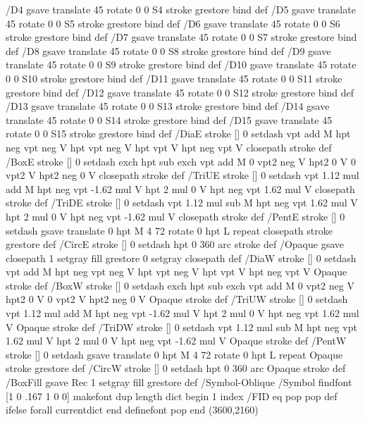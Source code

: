 {{/D4 { gsave translate 45 rotate 0 0 S4 stroke grestore } bind def
/D5 { gsave translate 45 rotate 0 0 S5 stroke grestore } bind def
/D6 { gsave translate 45 rotate 0 0 S6 stroke grestore } bind def
/D7 { gsave translate 45 rotate 0 0 S7 stroke grestore } bind def
/D8 { gsave translate 45 rotate 0 0 S8 stroke grestore } bind def
/D9 { gsave translate 45 rotate 0 0 S9 stroke grestore } bind def
/D10 { gsave translate 45 rotate 0 0 S10 stroke grestore } bind def
/D11 { gsave translate 45 rotate 0 0 S11 stroke grestore } bind def
/D12 { gsave translate 45 rotate 0 0 S12 stroke grestore } bind def
/D13 { gsave translate 45 rotate 0 0 S13 stroke grestore } bind def
/D14 { gsave translate 45 rotate 0 0 S14 stroke grestore } bind def
/D15 { gsave translate 45 rotate 0 0 S15 stroke grestore } bind def
/DiaE { stroke [] 0 setdash vpt add M
  hpt neg vpt neg V hpt vpt neg V
  hpt vpt V hpt neg vpt V closepath stroke } def
/BoxE { stroke [] 0 setdash exch hpt sub exch vpt add M
  0 vpt2 neg V hpt2 0 V 0 vpt2 V
  hpt2 neg 0 V closepath stroke } def
/TriUE { stroke [] 0 setdash vpt 1.12 mul add M
  hpt neg vpt -1.62 mul V
  hpt 2 mul 0 V
  hpt neg vpt 1.62 mul V closepath stroke } def
/TriDE { stroke [] 0 setdash vpt 1.12 mul sub M
  hpt neg vpt 1.62 mul V
  hpt 2 mul 0 V
  hpt neg vpt -1.62 mul V closepath stroke } def
/PentE { stroke [] 0 setdash gsave
  translate 0 hpt M 4 {72 rotate 0 hpt L} repeat
  closepath stroke grestore } def
/CircE { stroke [] 0 setdash 
  hpt 0 360 arc stroke } def
/Opaque { gsave closepath 1 setgray fill grestore 0 setgray closepath } def
/DiaW { stroke [] 0 setdash vpt add M
  hpt neg vpt neg V hpt vpt neg V
  hpt vpt V hpt neg vpt V Opaque stroke } def
/BoxW { stroke [] 0 setdash exch hpt sub exch vpt add M
  0 vpt2 neg V hpt2 0 V 0 vpt2 V
  hpt2 neg 0 V Opaque stroke } def
/TriUW { stroke [] 0 setdash vpt 1.12 mul add M
  hpt neg vpt -1.62 mul V
  hpt 2 mul 0 V
  hpt neg vpt 1.62 mul V Opaque stroke } def
/TriDW { stroke [] 0 setdash vpt 1.12 mul sub M
  hpt neg vpt 1.62 mul V
  hpt 2 mul 0 V
  hpt neg vpt -1.62 mul V Opaque stroke } def
/PentW { stroke [] 0 setdash gsave
  translate 0 hpt M 4 {72 rotate 0 hpt L} repeat
  Opaque stroke grestore } def
/CircW { stroke [] 0 setdash 
  hpt 0 360 arc Opaque stroke } def
/BoxFill { gsave Rec 1 setgray fill grestore } def
/Symbol-Oblique /Symbol findfont [1 0 .167 1 0 0] makefont
dup length dict begin {1 index /FID eq {pop pop} {def} ifelse} forall
currentdict end definefont pop
end
}}%
\GNUPLOTpicture(3600,2160)
